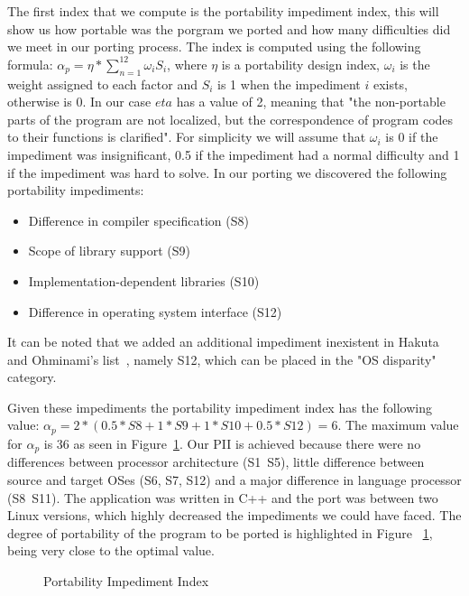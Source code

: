 The first index that we compute is the portability impediment index, this will
show us how portable was the porgram we ported and how many difficulties did
we meet in our porting process. The index is computed using the following
formula: $\alpha_p = \eta * \sum_{n=1}^{12} \omega_i S_i$, where $\eta$ is a
portability design index, $\omega_i$ is the weight assigned to each factor and
$S_i$ is 1 when the impediment $i$ exists, otherwise is 0. In our case $eta$
has a value of 2, meaning that "the non-portable parts of the program are not
localized, but the correspondence of program codes to their functions is
clarified". For simplicity we will assume that $\omega_i$ is 0 if the impediment
was insignificant, 0.5 if the impediment had a normal difficulty and 1 if the
impediment was hard to solve. In our porting we discovered the following
portability impediments:
\begin{itemize}
    \item Difference in compiler specification (S8)
    \item Scope of library support (S9)
    \item Implementation-dependent libraries (S10)
    \item Difference in operating system interface (S12)
\end{itemize}

It can be noted that we added an additional impediment inexistent in Hakuta and
Ohminami's list~\cite{b2}, namely S12, which can be placed in the "OS disparity"
category.

Given these impediments the portability impediment index has the following
value: $\alpha_p = 2 * (0.5 * S8 + 1 * S9 + 1 * S10 + 0.5 * S12) = 6$. The
maximum value for $\alpha_p$ is 36 as seen in Figure~\ref{fig:PII}. Our PII is
achieved because there were
no differences between processor architecture (S1~S5), little difference between
source and target OSes (S6, S7, S12) and a major difference in language processor
(S8~S11). The application was written in C++ and the port was between two Linux
versions, which highly decreased the impediments we could have faced. The
degree of portability of the program to be ported is highlighted in Figure
~\ref{fig:PII}, being very close to the optimal value.

\begin{figure}

    \caption{Portability Impediment Index}
    \label{fig:PII}
\end{figure}



